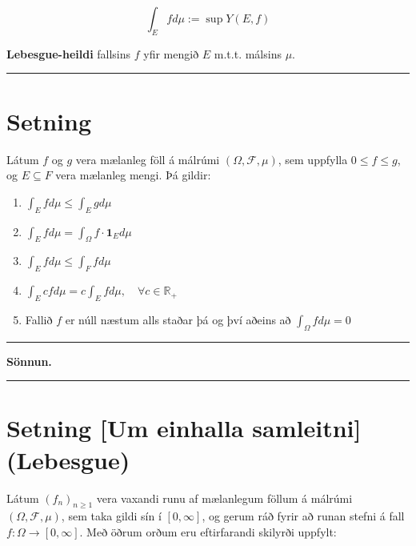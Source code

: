 \documentclass[]{book}
\begin{document}
\[
\int_E f d\mu := \sup Y(E,f)
\]

\textbf{Lebesgue-heildi} fallsins \(f\) yfir mengið \(E\) m.t.t. málsins \(\mu\).

\begin{center}\rule{0.5\linewidth}{\linethickness}\end{center}

\hypertarget{setning-46}{%
\section{Setning}\label{setning-46}}

Látum \(f\) og \(g\) vera mælanleg föll á málrúmi \((\Omega, \mathcal F, \mu)\), sem uppfylla \(0 \leq f \leq g\), og \(E \subseteq F\) vera mælanleg mengi. Þá gildir:

\begin{enumerate}
\def\labelenumi{\arabic{enumi}.}
\item
  \(\int_E f d\mu \leq \int_E g d\mu\)
\item
  \(\int_E f d\mu = \int_\Omega f \cdot \mathbf 1_E d\mu\)
\item
  \(\int_E f d\mu \leq \int_F f d\mu\)
\item
  \(\int_E cf d\mu = c\int_E f d\mu, \quad \forall c \in \mathbb R_+\)
\item
  Fallið \(f\) er núll næstum alls staðar þá og því aðeins að \(\int_\Omega f d\mu = 0\)
\end{enumerate}

\begin{center}\rule{0.5\linewidth}{\linethickness}\end{center}

\textbf{Sönnun.}

\begin{center}\rule{0.5\linewidth}{\linethickness}\end{center}

\hypertarget{setning-um-einhalla-samleitni-lebesgue}{%
\section{Setning {[}Um einhalla samleitni{]} (Lebesgue)}\label{setning-um-einhalla-samleitni-lebesgue}}

Látum \((f_n)_{n\geq1}\) vera vaxandi runu af mælanlegum föllum á málrúmi \((\Omega, \mathcal F, \mu)\), sem taka gildi sín í \([0, \infty]\), og gerum ráð fyrir að runan stefni á fall \(f: \Omega \rightarrow [0, \infty]\). Með öðrum orðum eru eftirfarandi skilyrði uppfylt:
\end{document}
